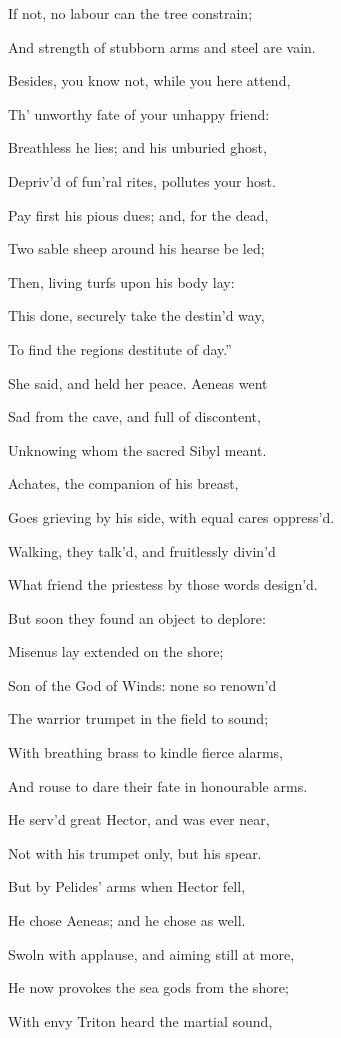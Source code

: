 If not, no labour can the tree constrain;

And strength of stubborn arms and steel are vain.

Besides, you know not, while you here attend,

Th’ unworthy fate of your unhappy friend:

Breathless he lies; and his unburied ghost,

Depriv’d of fun’ral rites, pollutes your host.

Pay first his pious dues; and, for the dead,

Two sable sheep around his hearse be led;

Then, living turfs upon his body lay:

This done, securely take the destin’d way,

To find the regions destitute of day.”

She said, and held her peace. Aeneas went

Sad from the cave, and full of discontent,

Unknowing whom the sacred Sibyl meant.

Achates, the companion of his breast,

Goes grieving by his side, with equal cares oppress’d.

Walking, they talk’d, and fruitlessly divin’d

What friend the priestess by those words design’d.

But soon they found an object to deplore:

Misenus lay extended on the shore;

Son of the God of Winds: none so renown’d

The warrior trumpet in the field to sound;

With breathing brass to kindle fierce alarms,

And rouse to dare their fate in honourable arms.

He serv’d great Hector, and was ever near,

Not with his trumpet only, but his spear.

But by Pelides’ arms when Hector fell,

He chose Aeneas; and he chose as well.

Swoln with applause, and aiming still at more,

He now provokes the sea gods from the shore;

With envy Triton heard the martial sound,

